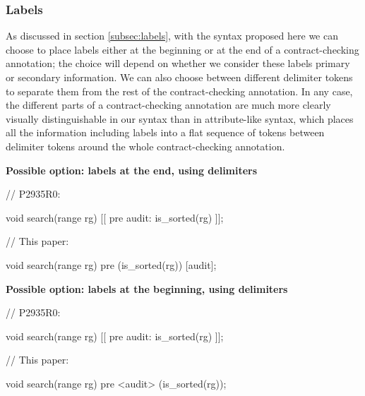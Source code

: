 \subsubsection{Labels}

As discussed in section \ref{subsec:labels}, with the syntax proposed here we can choose to place labels either at the beginning or at the end of a contract-checking annotation; the choice will depend on whether we consider these labels primary or secondary information. We can also choose between different delimiter tokens to separate them from the rest of the contract-checking annotation. In any case, the different parts of a contract-checking annotation are much more clearly visually distinguishable in our syntax than in attribute-like syntax, which places all the information including labels into a flat sequence of tokens between delimiter tokens around the whole contract-checking annotation.

\pagebreak %

\textbf{Possible option: labels at the end, using \tcode{[...]} delimiters}
\vspace{3mm}

\begin{minipage}{8cm}
\begin{codeblock}
// P2935R0:

void search(range rg)
  [[ pre audit: is_sorted(rg) ]];
\end{codeblock}
\end{minipage}
\begin{minipage}{8cm}
\begin{codeblock}
// This paper:

void search(range rg)
  pre (is_sorted(rg)) [audit];
\end{codeblock}
\end{minipage}

\vspace{3mm}
\textbf{Possible option: labels at the beginning, using  delimiters}
\vspace{3mm}

\begin{minipage}{8cm}
\begin{codeblock}
// P2935R0:

void search(range rg)
  [[ pre audit: is_sorted(rg) ]];
\end{codeblock}
\end{minipage}
\begin{minipage}{8cm}
\begin{codeblock}
// This paper:

void search(range rg)
  pre <audit> (is_sorted(rg));
\end{codeblock}
\end{minipage}

